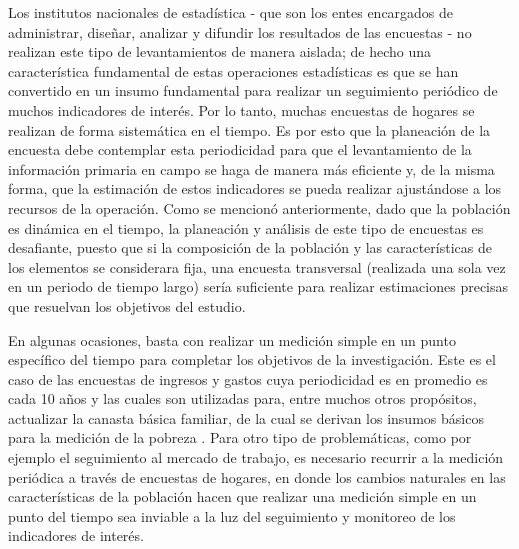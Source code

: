 Los institutos nacionales de estadística - que son los entes encargados de administrar, diseñar, analizar y difundir los resultados de las encuestas - no realizan este tipo de levantamientos de manera aislada; de hecho una característica fundamental de estas operaciones estadísticas es que se han convertido en un insumo fundamental para realizar un seguimiento periódico de muchos indicadores de interés. Por lo tanto, muchas encuestas de hogares se realizan de forma sistemática en el tiempo. Es por esto que la planeación de la encuesta debe contemplar esta periodicidad para que el levantamiento de la información primaria en campo se haga de manera más eficiente y, de la misma forma, que la estimación de estos indicadores se pueda realizar ajustándose a los recursos de la operación. Como se mencionó anteriormente, dado que la población es dinámica en el tiempo, la planeación y análisis de este tipo de encuestas es desafiante, puesto que si la composición de la población y las características de los elementos se considerara fija, una encuesta transversal (realizada una sola vez en un periodo de tiempo largo) sería suficiente para realizar estimaciones precisas que resuelvan los objetivos del estudio.

En algunas ocasiones, basta con realizar un medición simple en un punto específico del tiempo para completar los objetivos de la investigación. Este es el caso de las encuestas de ingresos y gastos cuya periodicidad es en promedio es cada 10 años y las cuales son utilizadas para, entre muchos otros propósitos, actualizar la canasta básica familiar, de la cual se derivan los insumos básicos para la medición de la pobreza \citep{CEPAL_2018}. Para otro tipo de problemáticas, como por ejemplo el seguimiento al mercado de trabajo, es necesario recurrir a la medición periódica a través de encuestas de hogares, en donde los cambios naturales en las características de la población hacen que realizar una medición simple en un punto del tiempo sea inviable a la luz del seguimiento y monitoreo de los indicadores de interés.

